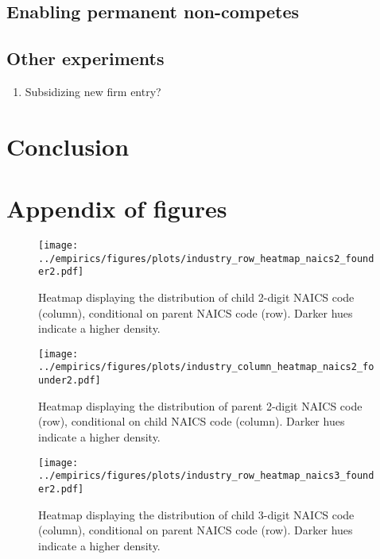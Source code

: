 \documentclass[12pt,english]{article}
\theoremstyle{remark}
\begin{document}
\subsection{Enabling permanent non-competes}

\subsection{Other experiments}

\begin{enumerate}
	\item Subsidizing new firm entry?
\end{enumerate}

\section{Conclusion}










\appendix




\section{Appendix of figures}


\begin{figure}[!htb]
	\centering
	\texttt{[image: ../empirics/figures/plots/industry\_row\_heatmap\_naics2\_founder2.pdf]}
	\caption{Heatmap displaying the distribution of child 2-digit NAICS code (column), conditional on parent NAICS code (row). Darker hues indicate a higher density.}
	\label{figure:industry_row_heatmap_naics2_founder2}
\end{figure}

\begin{figure}[!htb]
	\centering
	\texttt{[image: ../empirics/figures/plots/industry\_column\_heatmap\_naics2\_founder2.pdf]}
	\caption{Heatmap displaying the distribution of parent 2-digit NAICS code (row), conditional on child NAICS code (column). Darker hues indicate a higher density.}
	\label{figure:industry_column_heatmap_naics2_founder2}
\end{figure}

\begin{figure}[!htb]
	\centering
	\texttt{[image: ../empirics/figures/plots/industry\_row\_heatmap\_naics3\_founder2.pdf]}
	\caption{Heatmap displaying the distribution of child 3-digit NAICS code (column), conditional on parent NAICS code (row). Darker hues indicate a higher density.}
	\label{figure:industry_row_heatmap_naics3_founder2}
\end{figure}
\end{document}
